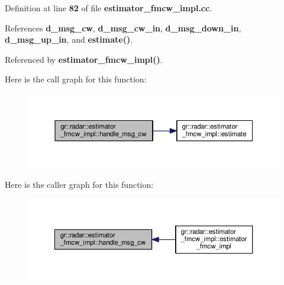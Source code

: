 Definition at line {\bf 82} of file {\bf estimator\+\_\+fmcw\+\_\+impl.\+cc}.



References {\bf d\+\_\+msg\+\_\+cw}, {\bf d\+\_\+msg\+\_\+cw\+\_\+in}, {\bf d\+\_\+msg\+\_\+down\+\_\+in}, {\bf d\+\_\+msg\+\_\+up\+\_\+in}, and {\bf estimate()}.



Referenced by {\bf estimator\+\_\+fmcw\+\_\+impl()}.



Here is the call graph for this function\+:
\nopagebreak
\begin{figure}[H]
\begin{center}
\leavevmode
\includegraphics[width=350pt]{d5/df2/classgr_1_1radar_1_1estimator__fmcw__impl_a69b8976b6ef8b8d197e7eaaf2e798ec2_cgraph}
\end{center}
\end{figure}




Here is the caller graph for this function\+:
\nopagebreak
\begin{figure}[H]
\begin{center}
\leavevmode
\includegraphics[width=350pt]{d5/df2/classgr_1_1radar_1_1estimator__fmcw__impl_a69b8976b6ef8b8d197e7eaaf2e798ec2_icgraph}
\end{center}
\end{figure}


